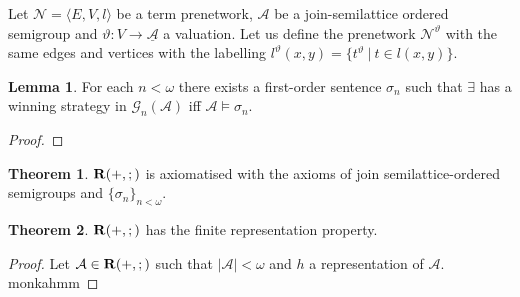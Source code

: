\documentclass[a4paper]{article}
\theoremstyle{definition}
\theoremstyle{theorem}
\newtheorem{theorem}{Theorem}
\theoremstyle{proposition}
\theoremstyle{lemma}
\newtheorem{lemma}{Lemma}
\theoremstyle{ex}
\theoremstyle{corollary}
\theoremstyle{claim}
\begin{document}
Let $\mathcal{N} = \langle E, V, l \rangle$ be a term prenetwork, $\mathcal{A}$ be a join-semilattice ordered semigroup and $\vartheta : V \to \underline{{\mathcal{A}}}$ a valuation. Let us define the prenetwork $\mathcal{N}^{\vartheta}$ with the same edges and vertices with the labelling $l^{\vartheta}(x, y) = \{ t^{\vartheta} \: | \: t \in l(x, y)\}$.

\begin{lemma}
  For each $n < \omega$ there exists a first-order sentence $\sigma_n$ such that $\exists$ has a winning strategy in $\mathcal{G}_n(\mathcal{A})$ iff $\mathcal{A} \models \sigma_n$.
\end{lemma}

\begin{proof}

\end{proof}

\begin{theorem}
  ${\bf R}(+, ;)$ is axiomatised with the axioms of join semilattice-ordered semigroups and $\{ \sigma_n \}_{n < \omega}$.
\end{theorem}


\begin{theorem}
  ${\bf R}(+, ;)$ has the finite representation property.
\end{theorem}

\begin{proof}
  Let $\mathcal{A} \in {\bf R}(+, ;)$ such that $|\mathcal{A}| < \omega$ and $h$ a representation of $\mathcal{A}$. monkahmm
\end{proof}

\begin{comment}
\section{Acknowledgements}

The author is sincerely grateful to Robin Hirsch, Ian Hodkinson, Stepan Kuznetsov, Valentin Shehtman, Eugeny Zolin, and his supervisor Ilya Shapirovsky for valuable conversations.\\The previous version of this paper contained an error. Many thanks to Jas Semrl for noticing that.
\end{comment}



\end{document}
